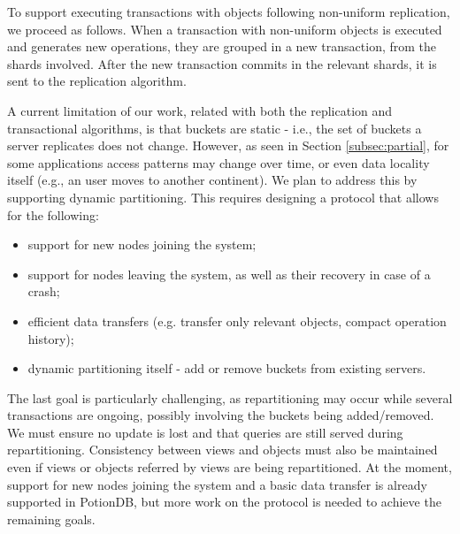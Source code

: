 
To support executing transactions with objects following non-uniform replication, we proceed as follows.
When a transaction with non-uniform objects is executed and generates new operations, they are grouped in a new transaction, from the shards involved.
After the new transaction commits in the relevant shards, it is sent to the replication algorithm.


A current limitation of our work, related with both the replication and transactional algorithms, is that buckets are static - i.e., the set of buckets a server replicates does not change.
However, as seen in Section \ref{subsec:partial}, for some applications access patterns may change over time, or even data locality itself (e.g., an user moves to another continent).
We plan to address this by supporting dynamic partitioning.
This requires designing a protocol that allows for the following:

\begin{itemize}
	\item support for new nodes joining the system;
	\item support for nodes leaving the system, as well as their recovery in case of a crash;
	\item efficient data transfers (e.g. transfer only relevant objects, compact operation history);
	\item dynamic partitioning itself - add or remove buckets from existing servers.
\end{itemize}

The last goal is particularly challenging, as repartitioning may occur while several transactions are ongoing, possibly involving the buckets being added/removed.
We must ensure no update is lost and that queries are still served during repartitioning.
Consistency between views and objects must also be maintained even if views or objects referred by views are being repartitioned.
At the moment, support for new nodes joining the system and a basic data transfer is already supported in PotionDB, but more work on the protocol is needed to achieve the remaining goals.


